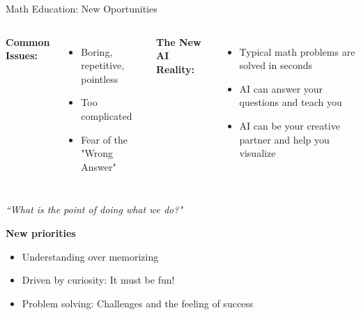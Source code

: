 \documentclass{beamer}
\begin{document}
\begin{frame}{\vspace{-0.4cm}Math Education: New Oportunities}
\vspace{-0.2cm}
  \begin{columns}
        \centering
        \textbf{\color{brand}Common Issues:}
        \begin{itemize}
          \item Boring, repetitive, pointless
          \item Too complicated
          \item Fear of the "Wrong Answer"
        \end{itemize}
        
        \centering
        \textbf{\color{brand}The New AI Reality:}
        \begin{itemize}
          \item Typical math problems are solved in seconds
          \item AI can answer your questions and teach you
          \item AI can be your creative partner and help you visualize
            
        \end{itemize}
  \end{columns}
  \vspace{0.1cm}
  \begin{center}
        \textit{``What is the point of doing what we do?"}
    \end{center}
    
    
    \pause

    \textbf{\color{accent}New priorities}
    \begin{itemize}
      
    \item Understanding over memorizing
    \item Driven by curiosity: It must be fun!
    \item Problem solving: Challenges and the feeling of success  
        \end{itemize}
    
\end{frame}
\end{document}
